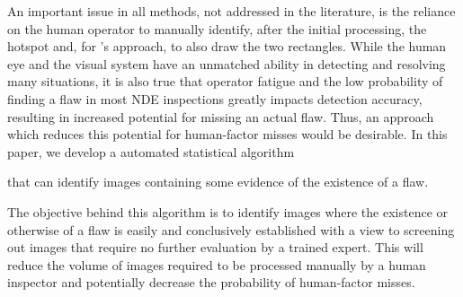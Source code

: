 \documentclass[12pt]{article}
\begin{document}
An important issue in all methods, not addressed in the literature, is
the reliance on the human operator to  manually identify, after the
initial processing, the hotspot and, for \citet{howardandgilmore94}'s
approach, to also draw the two rectangles. While the human eye and the visual 
system have an unmatched ability in detecting and resolving many
situations, it is also true that operator fatigue and the low
probability of finding a flaw in most NDE inspections greatly impacts
detection accuracy, resulting in increased potential for missing an 
actual flaw. Thus, an approach which reduces this potential for
human-factor misses would be desirable. In this paper, we  develop a
automated statistical algorithm 
\begin{comment}
automatic flaw detection in NDE images. Although expert inspectors are
routinely used to evaluate images, machine evaluation can avoid much 
human-factors variability and is particularly useful  to screen
images, identifying those that require further evaluation by 
an expert. Therefore, the goal of our work is to develop an automatic
screening algorithm
\end{comment}
that  can identify images containing some evidence 
of the existence of a flaw. 
\begin{comment}
The motivation  for using this algorithm
is to reduce the probability of human-factor misses that  can be
caused by a combination of human fatigue and the low probability of
finding  a flaw in a given inspection opportunity. 
\end{comment}
The objective behind this algorithm is to identify images
where the existence or otherwise of a flaw is easily and conclusively
established with a view to screening out images that require no 
further  evaluation by a trained expert. This will reduce the volume
of images required to be processed manually by a human inspector and
potentially decrease the probability of human-factor misses. 
\end{document}
